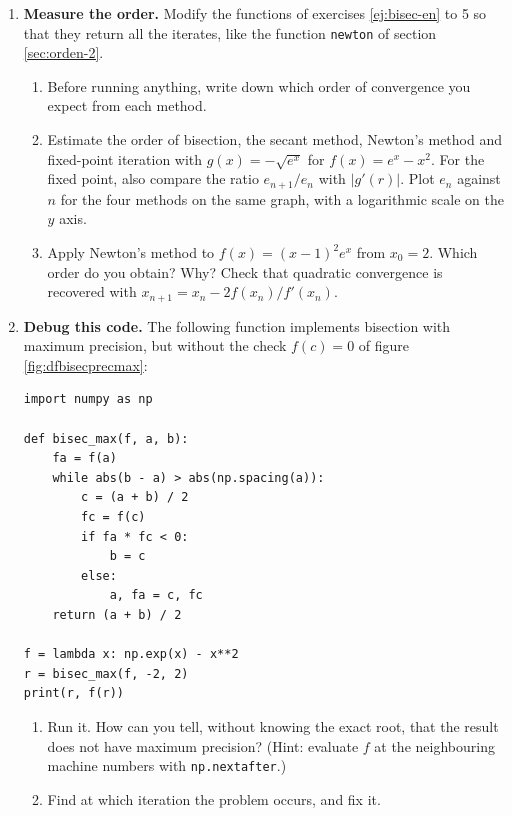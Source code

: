 \begin{enumerate}
\item \label{ej:orden-en} \textbf{Measure the order.} Modify the functions of exercises \ref{ej:bisec-en} to 5 so that they return all the iterates, like the function \texttt{newton} of section \ref{sec:orden-2}.
\begin{enumerate}
\item Before running anything, write down which order of convergence you expect from each method.
\item Estimate the order of bisection, the secant method, Newton's method and fixed-point iteration with $g(x)=-\sqrt{e^x}$ for $f(x)=e^x-x^2$. For the fixed point, also compare the ratio $e_{n+1}/e_n$ with $\vert g'(r)\vert$. Plot $e_n$ against $n$ for the four methods on the same graph, with a logarithmic scale on the $y$ axis.
\item Apply Newton's method to $f(x)=(x-1)^2e^x$ from $x_0=2$. Which order do you obtain? Why? Check that quadratic convergence is recovered with $x_{n+1}=x_n-2f(x_n)/f'(x_n)$.
\end{enumerate}

\item \textbf{Debug this code.} The following function implements bisection with maximum precision, but without the check $f(c)=0$ of figure \ref{fig:dfbisecprecmax}:
\begin{verbatim}
import numpy as np

def bisec_max(f, a, b):
    fa = f(a)
    while abs(b - a) > abs(np.spacing(a)):
        c = (a + b) / 2
        fc = f(c)
        if fa * fc < 0:
            b = c
        else:
            a, fa = c, fc
    return (a + b) / 2

f = lambda x: np.exp(x) - x**2
r = bisec_max(f, -2, 2)
print(r, f(r))
\end{verbatim}
\begin{enumerate}
\item Run it. How can you tell, without knowing the exact root, that the result does not have maximum precision? (Hint: evaluate $f$ at the neighbouring machine numbers with \texttt{np.nextafter}.)
\item Find at which iteration the problem occurs, and fix it.
\end{enumerate}


\end{enumerate}

